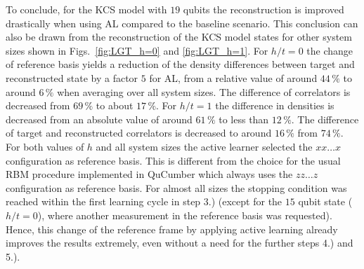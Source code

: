 \documentclass[pra,aps,showpacs,groupedaddress,superscriptaddress,twocolumn,toc=flat,biblatex,footinbib]{revtex4-1}
\begin{document}
To conclude, for the KCS model with $19$ qubits the reconstruction is improved drastically when using AL compared to the baseline scenario. This conclusion can also be drawn from the reconstruction of the KCS model states for other system sizes shown in Figs.~\ref{fig:LGT_h=0} and \ref{fig:LGT_h=1}. 
 For $h/t=0$ the change of reference basis yields a reduction of the density differences between target and reconstructed state by a factor $5$ for AL, from a relative value of around $44\,\%$ to around $6\,\%$ when averaging over all system sizes. The difference of correlators is decreased from $69\,\%$ to about $17\,\%$.  
For $h/t=1$ the difference in densities is decreased from an absolute value of around $61\,\%$ to less than $12\,\%$. The difference of target and reconstructed correlators is decreased to around $16\,\%$ from $74\,\%$. For both values of $h$ and all system sizes the active learner selected the $xx\dots x$ configuration as reference basis. This is different from the choice for the usual RBM procedure implemented in QuCumber which always uses the $zz\dots z$ configuration as reference basis. For almost all sizes the stopping condition was reached within the first learning cycle in step 3.)  (except for the $15$ qubit state ($h/t=0$), where another measurement in the reference basis was requested). Hence, this change of the reference frame by applying active learning already improves the results extremely, even without a need for the further steps 4.) and 5.).
\end{document}
